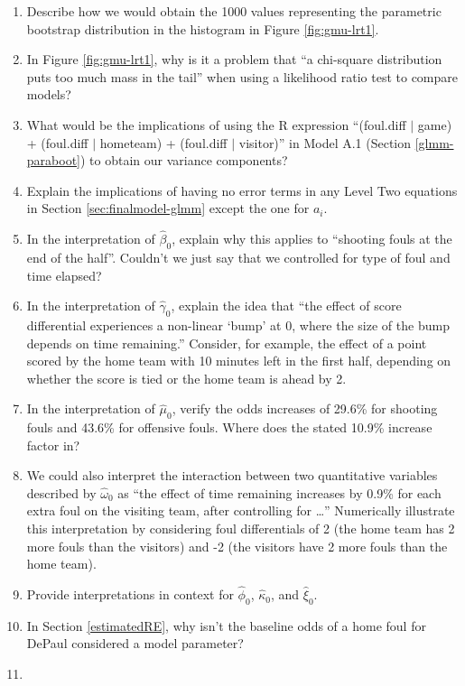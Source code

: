 \documentclass[
]{krantz}
\begin{document}
\begin{enumerate}
\item
  Describe how we would obtain the 1000 values representing the parametric bootstrap distribution in the histogram in Figure \ref{fig:gmu-lrt1}.
\item
  In Figure \ref{fig:gmu-lrt1}, why is it a problem that ``a chi-square distribution puts too much mass in the tail'' when using a likelihood ratio test to compare models?
\item
  What would be the implications of using the R expression ``(foul.diff \(\mid\) game) + (foul.diff \(\mid\) hometeam) + (foul.diff \(\mid\) visitor)'' in Model A.1 (Section \ref{glmm-paraboot}) to obtain our variance components?
\item
  Explain the implications of having no error terms in any Level Two equations in Section \ref{sec:finalmodel-glmm} except the one for \(a_{i}\).
\item
  In the interpretation of \(\hat{\beta}_{0}\), explain why this applies to ``shooting fouls at the end of the half''. Couldn't we just say that we controlled for type of foul and time elapsed?
\item
  In the interpretation of \(\hat{\gamma}_{0}\), explain the idea that ``the effect of score differential experiences a non-linear `bump' at 0, where the size of the bump depends on time remaining.'' Consider, for example, the effect of a point scored by the home team with 10 minutes left in the first half, depending on whether the score is tied or the home team is ahead by 2.
\item
  In the interpretation of \(\hat{\mu}_{0}\), verify the odds increases of 29.6\% for shooting fouls and 43.6\% for offensive fouls. Where does the stated 10.9\% increase factor in?
\item
  We could also interpret the interaction between two quantitative variables described by \(\hat{\omega}_{0}\) as ``the effect of time remaining increases by 0.9\% for each extra foul on the visiting team, after controlling for \ldots{}'' Numerically illustrate this interpretation by considering foul differentials of 2 (the home team has 2 more fouls than the visitors) and -2 (the visitors have 2 more fouls than the home team).
\item
  Provide interpretations in context for \(\hat{\phi}_{0}\), \(\hat{\kappa}_{0}\), and \(\hat{\xi}_{0}\).
\item
  In Section \ref{estimatedRE}, why isn't the baseline odds of a home foul for DePaul considered a model parameter?
\item

\end{enumerate}
\end{document}
